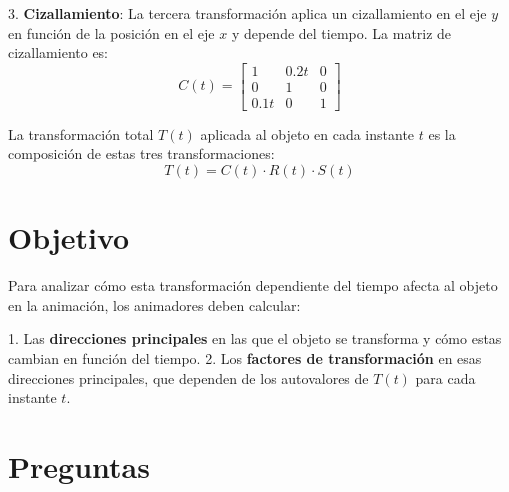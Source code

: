 \documentclass{article}
\begin{document}
3. \textbf{Cizallamiento}: La tercera transformación aplica un cizallamiento en el eje \( y \) en función de la posición en el eje \( x \) y depende del tiempo. La matriz de cizallamiento es:
   \[
   C(t) = \begin{bmatrix} 1 & 0.2t & 0 \\ 0 & 1 & 0 \\ 0.1t & 0 & 1 \end{bmatrix}
   \]

La transformación total \( T(t) \) aplicada al objeto en cada instante \( t \) es la composición de estas tres transformaciones:
\[
T(t) = C(t) \cdot R(t) \cdot S(t)
\]

\section*{Objetivo}

Para analizar cómo esta transformación dependiente del tiempo afecta al objeto en la animación, los animadores deben calcular:

1. Las \textbf{direcciones principales} en las que el objeto se transforma y cómo estas cambian en función del tiempo.
2. Los \textbf{factores de transformación} en esas direcciones principales, que dependen de los autovalores de \( T(t) \) para cada instante \( t \).

\section*{Preguntas}
\end{document}
